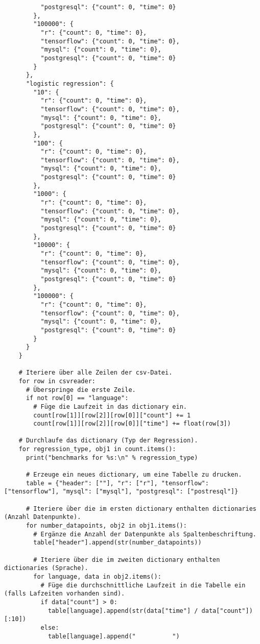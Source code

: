 \begin{verbatim}
          "postgresql": {"count": 0, "time": 0}
        },
        "100000": {
          "r": {"count": 0, "time": 0},
          "tensorflow": {"count": 0, "time": 0},
          "mysql": {"count": 0, "time": 0},
          "postgresql": {"count": 0, "time": 0}
        }
      },
      "logistic regression": {
        "10": {
          "r": {"count": 0, "time": 0},
          "tensorflow": {"count": 0, "time": 0},
          "mysql": {"count": 0, "time": 0},
          "postgresql": {"count": 0, "time": 0}
        },
        "100": {
          "r": {"count": 0, "time": 0},
          "tensorflow": {"count": 0, "time": 0},
          "mysql": {"count": 0, "time": 0},
          "postgresql": {"count": 0, "time": 0}
        },
        "1000": {
          "r": {"count": 0, "time": 0},
          "tensorflow": {"count": 0, "time": 0},
          "mysql": {"count": 0, "time": 0},
          "postgresql": {"count": 0, "time": 0}
        },
        "10000": {
          "r": {"count": 0, "time": 0},
          "tensorflow": {"count": 0, "time": 0},
          "mysql": {"count": 0, "time": 0},
          "postgresql": {"count": 0, "time": 0}
        },
        "100000": {
          "r": {"count": 0, "time": 0},
          "tensorflow": {"count": 0, "time": 0},
          "mysql": {"count": 0, "time": 0},
          "postgresql": {"count": 0, "time": 0}
        }
      }
    }

    # Iteriere über alle Zeilen der csv-Datei.
    for row in csvreader:
      # Überspringe die erste Zeile.
      if not row[0] == "language":
        # Füge die Laufzeit in das dictionary ein.
        count[row[1]][row[2]][row[0]]["count"] += 1
        count[row[1]][row[2]][row[0]]["time"] += float(row[3])

    # Durchlaufe das dictionary (Typ der Regression).
    for regression_type, obj1 in count.items():
      print("benchmarks for %s:\n" % regression_type)

      # Erzeuge ein neues dictionary, um eine Tabelle zu drucken.
      table = {"header": [""], "r": ["r"], "tensorflow": ["tensorflow"], "mysql": ["mysql"], "postgresql": ["postresql"]}

      # Iteriere über die im ersten dictionary enthalten dictionaries (Anzahl Datenpunkte).
      for number_datapoints, obj2 in obj1.items():
        # Ergänze die Anzahl der Datenpunkte als Spaltenbeschriftung.
        table["header"].append(str(number_datapoints))

        # Iteriere über die im zweiten dictionary enthalten dictionaries (Sprache).
        for language, data in obj2.items():
          # Füge die durchschnittliche Laufzeit in die Tabelle ein (falls Lafzeiten vorhanden sind).
          if data["count"] > 0:
            table[language].append(str(data["time"] / data["count"])[:10])
          else:
            table[language].append("          ")


\end{verbatim}
